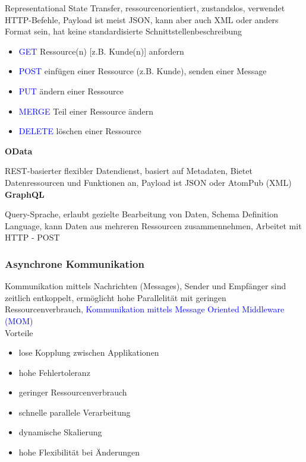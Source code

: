 Representational State Transfer, ressourcenorientiert, zustandslos, verwendet HTTP-Befehle, Payload ist meist JSON, kann aber auch XML oder anders Format sein, hat keine standardisierte Schnittstellenbeschreibung


\begin{itemize}
    \item \textcolor{blue}{GET} Ressource(n) [z.B. Kunde(n)] anfordern
    \item \textcolor{blue}{POST} einfügen einer Ressource (z.B. Kunde), senden einer Message
    \item \textcolor{blue}{PUT} ändern einer Ressource
    \item \textcolor{blue}{MERGE} Teil einer Ressource ändern
    \item \textcolor{blue}{DELETE} löschen einer Ressource
\end{itemize}
\vspace{10pt}
\textbf{OData}

REST-basierter flexibler Datendienst, basiert auf Metadaten, Bietet Datenressourcen und Funktionen an, Payload ist JSON oder AtomPub (XML) \\

\textbf{GraphQL}

Query-Sprache, erlaubt gezielte Bearbeitung von Daten, Schema Definition Language, kann Daten aus mehreren Ressourcen zusammennehmen, Arbeitet mit HTTP - POST

\columnbreak
\subsubsection{Asynchrone Kommunikation}

Kommunikation mittels Nachrichten (Messages), Sender und Empfänger sind zeitlich entkoppelt, ermöglicht hohe Parallelität mit geringen Ressourcenverbrauch, \textcolor{blue}{Kommunikation mittels Message Oriented Middleware (MOM)} \\

Vorteile

\begin{itemize}
    \item lose Kopplung zwischen Applikationen
    \item hohe Fehlertoleranz
    \item geringer Ressourcenverbrauch
    \item schnelle parallele Verarbeitung
    \item dynamische Skalierung
    \item hohe Flexibilität bei Änderungen
\end{itemize}

